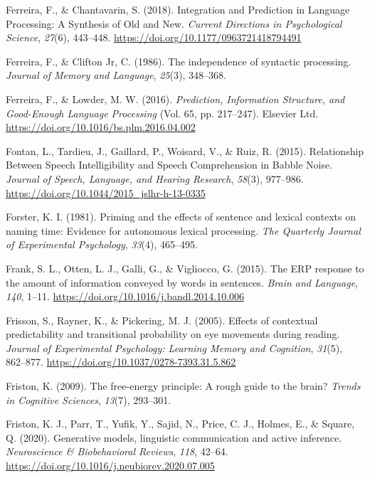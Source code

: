 \documentclass[a4paper, nobind]{templates/ociamthesis}
\newlength{\cslhangindent}
\newenvironment{CSLReferences}[2] %
 {%
  \setlength{\parindent}{0pt}
  \ifodd #1
  \let\oldpar\par
  \def\par{\hangindent=\cslhangindent\oldpar}
  \fi
  \setlength{\parskip}{1mm}
  \setlength{\baselineskip}{6mm}
 }%
 {}
\begin{document}
\begin{CSLReferences}{1}{0}
\leavevmode{}%
Ferreira, F., \& Chantavarin, S. (2018). {Integration and Prediction in Language Processing: A Synthesis of Old and New}. \emph{Current Directions in Psychological Science}, \emph{27}(6), 443--448. \url{https://doi.org/10.1177/0963721418794491}

\leavevmode{}%
Ferreira, F., \& Clifton Jr, C. (1986). The independence of syntactic processing. \emph{Journal of Memory and Language}, \emph{25}(3), 348--368.

\leavevmode{}%
Ferreira, F., \& Lowder, M. W. (2016). \emph{{Prediction, Information Structure, and Good-Enough Language Processing}} (Vol. 65, pp. 217--247). Elsevier Ltd. \url{https://doi.org/10.1016/bs.plm.2016.04.002}

\leavevmode{}%
Fontan, L., Tardieu, J., Gaillard, P., Woisard, V., \& Ruiz, R. (2015). Relationship Between Speech Intelligibility and Speech Comprehension in Babble Noise. \emph{Journal of Speech, Language, and Hearing Research}, \emph{58}(3), 977--986. \url{https://doi.org/10.1044/2015_jslhr-h-13-0335}

\leavevmode{}%
Forster, K. I. (1981). Priming and the effects of sentence and lexical contexts on naming time: Evidence for autonomous lexical processing. \emph{The Quarterly Journal of Experimental Psychology}, \emph{33}(4), 465--495.

\leavevmode{}%
Frank, S. L., Otten, L. J., Galli, G., \& Vigliocco, G. (2015). {The ERP response to the amount of information conveyed by words in sentences}. \emph{Brain and Language}, \emph{140}, 1--11. \url{https://doi.org/10.1016/j.bandl.2014.10.006}

\leavevmode{}%
Frisson, S., Rayner, K., \& Pickering, M. J. (2005). {Effects of contextual predictability and transitional probability on eye movements during reading}. \emph{Journal of Experimental Psychology: Learning Memory and Cognition}, \emph{31}(5), 862--877. \url{https://doi.org/10.1037/0278-7393.31.5.862}

\leavevmode{}%
Friston, K. (2009). The free-energy principle: A rough guide to the brain? \emph{Trends in Cognitive Sciences}, \emph{13}(7), 293--301.

\leavevmode{}%
Friston, K. J., Parr, T., Yufik, Y., Sajid, N., Price, C. J., Holmes, E., \& Square, Q. (2020). {Generative models, linguistic communication and active inference}. \emph{Neuroscience {\&} Biobehavioral Reviews}, \emph{118}, 42--64. \url{https://doi.org/10.1016/j.neubiorev.2020.07.005}


\end{CSLReferences}
\end{document}
